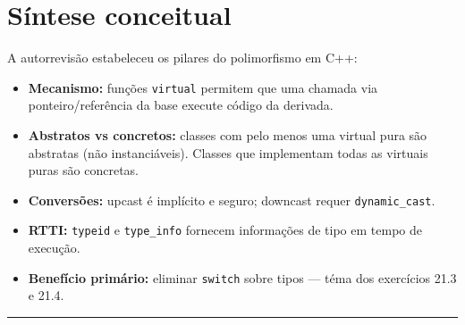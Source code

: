 \documentclass[11pt,a4paper]{article}
\begin{document}
\section*{S\'intese conceitual}

A autorrevisão estabeleceu os pilares do polimorfismo em C++:

\begin{itemize}[leftmargin=*,itemsep=0pt]
  \item \textbf{Mecanismo:} fun\c{c}\~oes \texttt{virtual} permitem que uma chamada via ponteiro/refer\^encia da base execute c\'odigo da derivada.
  \item \textbf{Abstratos vs concretos:} classes com pelo menos uma virtual pura s\~ao abstratas (n\~ao instanci\'aveis). Classes que implementam todas as virtuais puras s\~ao concretas.
  \item \textbf{Convers\~oes:} upcast \'e impl\'icito e seguro; downcast requer \texttt{dynamic\_cast}.
  \item \textbf{RTTI:} \texttt{typeid} e \texttt{type\_info} fornecem informa\c{c}\~oes de tipo em tempo de execu\c{c}\~ao.
  \item \textbf{Benef\'icio prim\'ario:} eliminar \texttt{switch} sobre tipos --- t\'ema dos exerc\'icios 21.3 e 21.4.
\end{itemize}

\vspace{1em}
\begin{center}\rule{0.5\textwidth}{0.4pt}\end{center}
\end{document}

